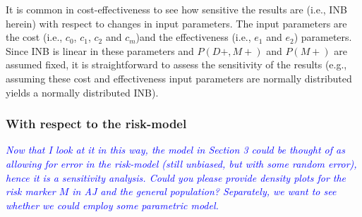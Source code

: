 \documentclass[11pt]{article}
\begin{document}
It is common in cost-effectiveness to see how sensitive the results are (i.e., INB herein) with respect to changes in input parameters. The input parameters are the cost (i.e., $c_0$, $c_1$, $c_2$ and $c_m$)and the effectiveness (i.e., $e_1$ and $e_2$) parameters. Since INB is linear in these parameters and $P(D+,M+)$ and $P(M+)$ are assumed fixed, it is straightforward to assess the sensitivity of the results (e.g., assuming these cost and effectiveness input parameters are normally distributed yields a normally distributed INB).

\subsubsection{With respect to the risk-model}

\textcolor{blue}{\it Now that I look at it in this way, the model in Section 3 could be thought of as allowing for error in the risk-model (still unbiased, but with some random error), hence it is a sensitivity analysis. Could you please provide density plots for the risk marker $M$ in AJ and the general population? Separately, we want to see whether we could employ some parametric model.}
\end{document}
